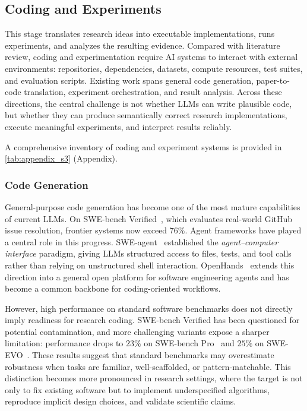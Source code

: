 \subsection{Coding and Experiments}
\label{sec:experiment}

This stage translates research ideas into executable implementations, runs experiments, and analyzes the resulting evidence. Compared with literature review, coding and experimentation require AI systems to interact with external environments: repositories, dependencies, datasets, compute resources, test suites, and evaluation scripts. Existing work spans general code generation, paper-to-code translation, experiment orchestration, and result analysis. Across these directions, the central challenge is not whether LLMs can write plausible code, but whether they can produce semantically correct research implementations, execute meaningful experiments, and interpret results reliably. 

A comprehensive inventory of coding and experiment systems is provided in \cref{tab:appendix_s3} (Appendix).



\subsubsection{Code Generation}
\label{sec:code_gen}

General-purpose code generation has become one of the most mature capabilities of current LLMs. On SWE-bench Verified~\cite{swebench2024_leaderboard}, which evaluates real-world GitHub issue resolution, frontier systems now exceed $76\%$. Agent frameworks have played a central role in this progress. SWE-agent~\cite{yang2024sweagent} established the \emph{agent--computer interface} paradigm, giving LLMs structured access to files, tests, and tool calls rather than relying on unstructured shell interaction. OpenHands~\cite{wang2024openhands} extends this direction into a general open platform for software engineering agents and has become a common backbone for coding-oriented workflows.

However, high performance on standard software benchmarks does not directly imply readiness for research coding. SWE-bench Verified has been questioned for potential contamination, and more challenging variants expose a sharper limitation: performance drops to $23\%$ on SWE-bench Pro~\cite{deng2025swebenchpro} and $25\%$ on SWE-EVO~\cite{thai2025sweevo}. These results suggest that standard benchmarks may overestimate robustness when tasks are familiar, well-scaffolded, or pattern-matchable. This distinction becomes more pronounced in research settings, where the target is not only to fix existing software but to implement underspecified algorithms, reproduce implicit design choices, and validate scientific claims.



